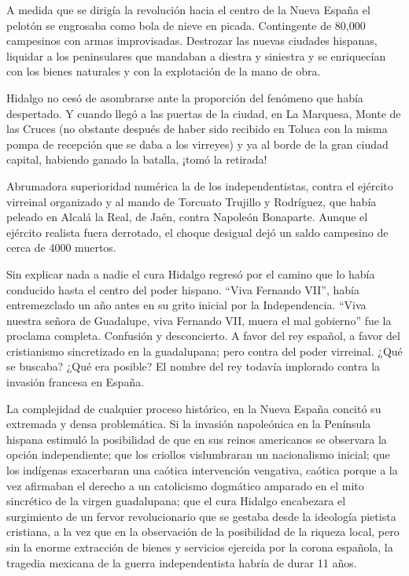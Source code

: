 A medida que se dirigía la revolución hacia
el centro de la Nueva España el pelotón se
engrosaba como bola de nieve en picada.
Contingente de 80,000 campesinos con armas
improvisadas. Destrozar las nuevas ciudades
hispanas, liquidar a los peninsulares que
mandaban a diestra y siniestra y se
enriquecían con los bienes naturales y con la
explotación de la mano de obra.

Hidalgo no cesó de asombrarse ante la
proporción del fenómeno que había despertado.
Y cuando llegó a las puertas de la ciudad, en
La Marquesa, Monte de las Cruces (no obstante
después de haber sido recibido en Toluca con
la misma pompa de recepción que se daba a los
virreyes) y ya al borde de la gran ciudad
capital, habiendo ganado la batalla, ¡tomó la
retirada!

Abrumadora superioridad numérica la de los
independentistas, contra el ejército
virreinal organizado y al mando de Torcuato
Trujillo y Rodríguez, que había peleado en
Alcalá la Real, de Jaén, contra Napoleón
Bonaparte. Aunque el ejército realista fuera
derrotado, el choque desigual dejó un saldo
campesino de cerca de 4000 muertos.

Sin explicar nada a nadie el cura Hidalgo
regresó por el camino que lo había conducido
hasta el centro del poder hispano. “Viva
Fernando VII”, había entremezclado un año
antes en su grito inicial por la
Independencia. “Viva nuestra señora de
Guadalupe, viva Fernando VII, muera el mal
gobierno” fue la proclama completa. Confusión
y desconcierto. A favor del rey español, a
favor del cristianismo sincretizado en la
guadalupana; pero contra del poder virreinal.
¿Qué se buscaba? ¿Qué era posible? El nombre
del rey todavía implorado contra la invasión
francesa en España.

La complejidad de cualquier proceso
histórico, en la Nueva España concitó su
extremada y densa problemática. Si la
invasión napoleónica en la Península hispana
estimuló la posibilidad de que en sus reinos
americanos se observara la opción
independiente; que los criollos vislumbraran
un nacionalismo inicial; que los indígenas
exacerbaran una caótica intervención
vengativa, caótica porque a la vez afirmaban
el derecho a un catolicismo dogmático
amparado en el mito sincrético de la virgen
guadalupana; que el cura Hidalgo encabezara
el surgimiento de un fervor revolucionario
que se gestaba desde la ideología pietista
cristiana, a la vez que en la observación de
la posibilidad de la riqueza local, pero sin
la enorme extracción de bienes y servicios
ejercida por la corona española, la tragedia
mexicana de la guerra independentista habría
de durar 11 años.

